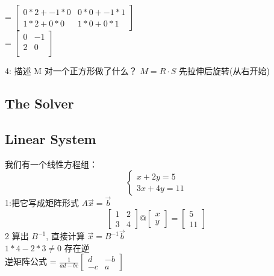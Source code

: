 \documentclass[12pt]{article}
\begin{document}
\begin{flushleft}
= $ \begin{bmatrix}
    0 * 2 + -1 * 0 &  0 * 0  + -1 * 1 \\ 
    1 * 2 + 0 * 0 &  1 * 0  + 0 * 1 
\end{bmatrix}$  \\

=  $\begin{bmatrix}
    0 & -1 \\ 
    2 & 0 \\
\end{bmatrix}$

4: 描述 M 对一个正方形做了什么？
$M  = R \cdot S$
先拉伸后旋转(从右开始) 
\subsection*{The Solver}
\subsection*{Linear System}
我们有一个线性方程组：
\[
\begin{cases}
    x  + 2y = 5 \\ 
    3x + 4y = 11
\end{cases}
\]
1:把它写成矩阵形式 $A\vec{x} = \vec{b}$
\[
\begin{bmatrix}
    1 & 2 \\
    3 & 4 
\end{bmatrix} @ \begin{bmatrix}
    x \\ y 
\end{bmatrix} =  \begin{bmatrix}
    5 \\ 11
\end{bmatrix}
\]
2 算出 $B^{-1}$, 直接计算 $\vec{x} = B^{-1}\vec{b}$ \\
$1*4 - 2*3 \neq 0$ 存在逆 \\
逆矩阵公式 =  $\frac{1}{ad - bc}\begin{bmatrix}
    d  & -b \\
    -c &  a 
\end{bmatrix}$ \\


\end{flushleft}
\end{document}
